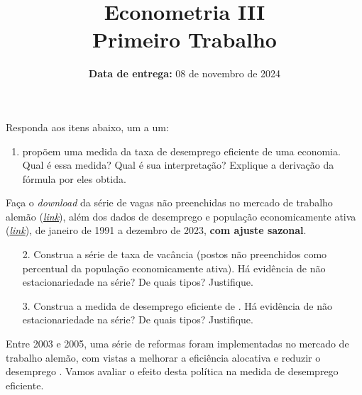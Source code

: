 \documentclass[12pt,a4paper]{article}
\title{ \large  Econometria III \\
	{\large Primeiro Trabalho}}
\date{\small \textbf{Data de entrega:} 08 de novembro de 2024}
\begin{document}
	\maketitle
	Responda aos itens abaixo, um a um:
\begin{enumerate}
	\item \citet{michaillat2022u} propõem uma medida da taxa de desemprego eficiente de uma economia. Qual é essa medida? Qual é sua interpretação? Explique a derivação da fórmula por eles obtida.
\end{enumerate}
	Faça o \textit{download} da série de vagas não preenchidas no mercado de trabalho alemão (\href{https://data-explorer.oecd.org/vis?tm=unfilled\%20vacancies\%20germany&pg=0&hc[Reference\%20area]=Germany&hc[Measure]=Unfilled\%20vacancies&snb=1&df[ds]=dsDisseminateFinalDMZ&df[id]=DSD_OLAB\%40DF_OIALAB_INDIC&df[ag]=OECD.SDD.TPS&df[vs]=1.1&pd=\%2C&dq=DEU.VAC_U.._Z.Y..M&ly[cl]=TIME_PERIOD&to[TIME_PERIOD]=false&lo=13&lom=LASTNPERIODS}{\textit{link}}), além dos dados de desemprego e população economicamente ativa (\href{https://www-genesis.destatis.de/genesis//online?operation=table&language=en&code=13231-0001&bypass=true&levelindex=0&levelid=1713437546333#abreadcrumb}{\textit{link}}), de janeiro de 1991 a dezembro de 2023, \textbf{com ajuste sazonal}.
	\begin{enumerate}
	\item[2.] Construa a série de taxa de vacância (postos não preenchidos como percentual da população economicamente ativa). Há evidência de não estacionariedade na série? De quais tipos? Justifique.
	
	\item[3.] Construa a medida de desemprego eficiente de \citet{michaillat2022u}. Há evidência de não estacionariedade na série? De quais tipos? Justifique.
	
\end{enumerate}
	Entre 2003 e 2005, uma série de reformas foram implementadas no mercado de trabalho alemão, com vistas a melhorar a eficiência alocativa e reduzir o desemprego \citep{Bradley2019}. Vamos avaliar o efeito desta política na medida de desemprego eficiente.
\end{document}
